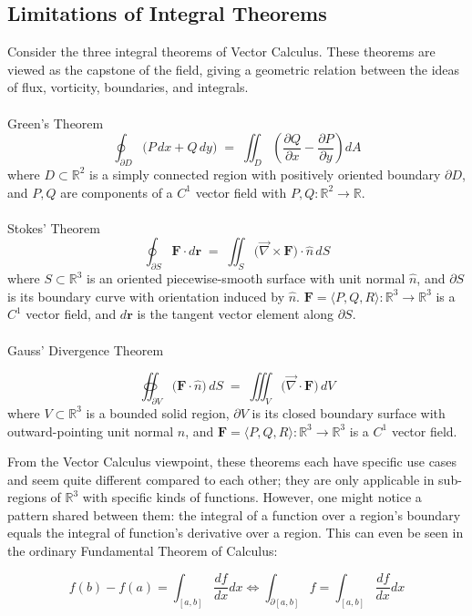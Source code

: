 \documentclass[12pt]{article}
\newcommand{\R}{\mathbb{R}}
\newcommand{\p}{\partial}
\newcommand{\bv}[1]{\mathbf{#1}}
\newcommand{\uv}[1]{\hat{#1}}
\begin{document}
\subsection{Limitations of Integral Theorems}
Consider the three integral theorems of Vector Calculus. These theorems are viewed as the capstone of the field, giving a geometric relation between the ideas of flux, vorticity, boundaries, and integrals. 
\\\\ Green's Theorem
\[
  \oint_{\partial D} \bigl(P\,dx + Q\,dy\bigr)
  \;=\;
  \iint_{D} \left(\frac{\partial Q}{\partial x} - \frac{\partial P}{\partial y}\right) dA
\]
where $D \subset \mathbb{R}^2$ is a simply connected region with positively oriented
boundary $\partial D$, and $P, Q$ are components of a $C^1$ vector field
with $P, Q : \mathbb{R}^2 \to \mathbb{R}$.
\\\\ Stokes' Theorem
\[
  \oint_{\partial S} \bv{F} \cdot d\bv{r}
  \;=\;
  \iint_{S} \bigl(\vec{\nabla} \times \bv{F}\bigr) \cdot \uv{n} \, dS
\]
where $S \subset \mathbb{R}^3$ is an oriented piecewise-smooth surface with unit normal
$\uv{n}$, and $\partial S$ is its boundary curve with orientation induced by $\uv{n}$.
$\bv{F} = \langle P, Q, R \rangle : \mathbb{R}^3 \to \mathbb{R}^3$ is a $C^1$
vector field, and $d\bv{r}$ is the tangent vector element along $\partial S$.
\\\\ Gauss' Divergence Theorem 

\[
  \oiint_{\partial V} \bigl(\bv{F} \cdot \uv{n}\bigr) \, dS
  \;=\;
  \iiint_{V} \bigl(\vec{\nabla} \cdot \bv{F}\bigr) \, dV
\]
where $V \subset \mathbb{R}^3$ is a bounded solid region, $\partial V$ is its
closed boundary surface with outward-pointing unit normal $\uv{n}$,
and $\bv{F} = \langle P, Q, R \rangle : \mathbb{R}^3 \to \mathbb{R}^3$ is a $C^1$
vector field.
\bigskip

From the Vector Calculus viewpoint, these theorems each have specific use cases and seem quite different compared to each other; they are only applicable in sub-regions of $\R^3$ with specific kinds of functions. However, one might notice a pattern shared between them: the integral of a function over a region's boundary equals the integral of function's derivative over a region. This can even be seen in the ordinary Fundamental Theorem of Calculus:

\[
f(b)-f(a) = \int_{[a,b]}{\frac{df}{dx}dx} \iff\int_{\p[a,b]}{f} =\int_{[a,b]}{\frac{df}{dx}dx}
\]
\end{document}
